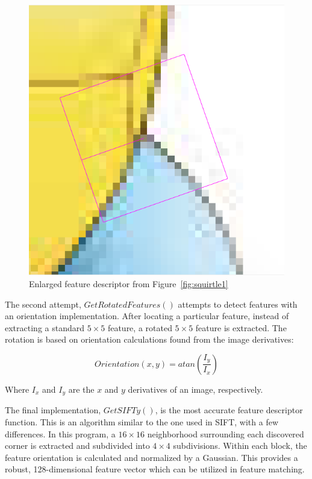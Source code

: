 \documentclass[12pt,journal,compsoc]{IEEEtran}
\begin{document}
\begin{figure}[h]
	\centering
		  \centering
		  \includegraphics[width=1\linewidth]{img/squirtle2}
		  \caption{Enlarged feature descriptor from Figure~\ref{fig:squirtle1}}
		  \label{fig:squirtle2}
\end{figure}


The second attempt, $GetRotatedFeatures()$ attempts to detect features with an orientation implementation. After locating a particular feature, instead of extracting a standard $5 \times 5$ feature, a rotated $5 \times 5$ feature is extracted. The rotation is based on orientation calculations found from the image derivatives:

$$
Orientation(x,y) = atan( \frac{I_{y}}{I_{x}} )
$$

Where $I_{x}$ and $I_{y}$ are the $x$ and $y$ derivatives of an image, respectively.

The final implementation, $GetSIFTy()$, is the most accurate feature descriptor function. This is an algorithm similar to the one used in SIFT, with a few differences.
In this program, a $16 \times 16$ neighborhood surrounding each discovered corner is extracted and subdivided into $4 \times 4$ subdivisions. Within each block, the feature orientation is calculated and normalized by a Gaussian. This provides a robust, 128-dimensional feature vector which can be utilized in feature matching.
\end{document}
